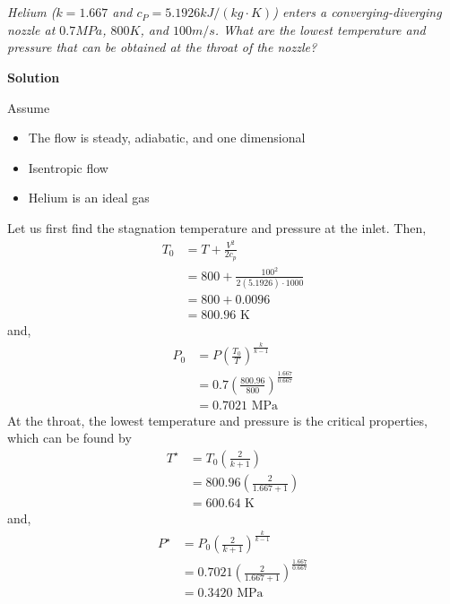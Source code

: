 \section{}

\textit{Helium ($k = 1.667$ and $c_P = 5.1926 kJ/(kg \cdot K)$) enters a converging-diverging nozzle at $0.7 MPa$, $800 K$, and $100 m/s$. What are the lowest temperature and pressure that can be obtained at the throat of the nozzle?}

\textbf{Solution}

Assume
\begin{itemize}
    \item The flow is steady, adiabatic, and one dimensional
    \item Isentropic flow
    \item Helium is an ideal gas
\end{itemize}

Let us first find the stagnation temperature and pressure at the inlet. Then,
\begin{align*}
    T_0 &= T + \frac{V^2}{2c_p} \\
    &= 800 + \frac{100^2}{2(5.1926)\cdot1000} \\
    &= 800 + 0.0096 \\
    &= 800.96 \text{ K}
\end{align*}
and,
\begin{align*}
    P_0 &= P \left( \frac{T_0}{T} \right)^{\frac{k}{k-1}} \\
    &= 0.7 \left( \frac{800.96}{800} \right)^{\frac{1.667}{0.667}} \\
    &= 0.7021 \text{ MPa}
\end{align*}
At the throat, the lowest temperature and pressure is the critical properties, which can be found by 
\begin{align*}
    T^\star &= T_0 \left( \frac{2}{k+1} \right) \\
    &= 800.96 \left( \frac{2}{1.667+1} \right) \\
    &= \boxed{600.64 \text{ K}}
\end{align*}
and,
\begin{align*}
    P^\star &= P_0 \left( \frac{2}{k+1} \right)^{\frac{k}{k-1}} \\
    &= 0.7021 \left( \frac{2}{1.667+1} \right)^{\frac{1.667}{0.667}} \\
    &= \boxed{0.3420 \text{ MPa}}
\end{align*}
